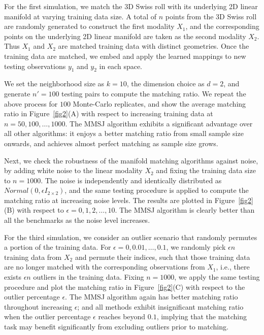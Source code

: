 \documentclass[times,twocolumn,final]{elsarticle}
\begin{document}
For the first simulation, we match the 3D Swiss roll with its underlying 2D linear manifold at varying training data size. A total of $n$ points from the 3D Swiss roll are randomly generated to construct the first modality $X_{1}$, and the corresponding points on the underlying 2D linear manifold are taken as the second modality $X_{2}$. Thus $X_{1}$ and $X_{2}$ are matched training data with distinct geometries. Once the training data are matched, we embed and apply the learned mappings to new testing observations $y_{1}$ and $y_{2}$ in each space.

We set the neighborhood size as $k=10$, the dimension choice as $d=2$, and generate $n'=100$ testing pairs to compute the matching ratio. We repeat the above process for $100$ Monte-Carlo replicates, and show the average matching ratio in Figure~\ref{fig2}(A) with respect to increasing training data at $n=50,100,\ldots,1000$. 
The MMSJ algorithm exhibits a significant advantage over all other algorithms: it enjoys a better matching ratio from small sample size onwards, and achieves almost perfect matching as sample size grows.

Next, we check the robustness of the manifold matching algorithms against noise, by adding white noise to the linear modality $X_{2}$ and fixing the training data size to $n=1000$. The noise is independently and identically distributed as $Normal(0, \epsilon I_{2 \times 2})$, and the same testing procedure is applied to compute the matching ratio at increasing noise levels. The results are plotted in Figure~\ref{fig2}(B) with respect to $\epsilon = 0,1,2,\ldots,10$. The MMSJ algorithm is clearly better than all the benchmarks as the noise level increases.

For the third simulation, we consider an outlier scenario that randomly permutes a portion of the training data. For $\epsilon=0,0.01,\ldots,0.1$, we randomly pick $\epsilon n$ training data from $X_{2}$ and permute their indices, such that those training data are no longer matched with the corresponding observations from $X_{1}$, i.e., there exists $\epsilon n$ outliers in the training data. Fixing $n=1000$, we apply the same testing procedure and plot the matching ratio in Figure~\ref{fig2}(C) with respect to the outlier percentage $\epsilon$. The MMSJ algorithm again has better matching ratio throughout increasing $\epsilon$; and all methods exhibit insignificant matching ratio when the outlier percentage $\epsilon$ reaches beyond $0.1$, implying that the matching task may benefit significantly from excluding outliers prior to matching.
\end{document}
